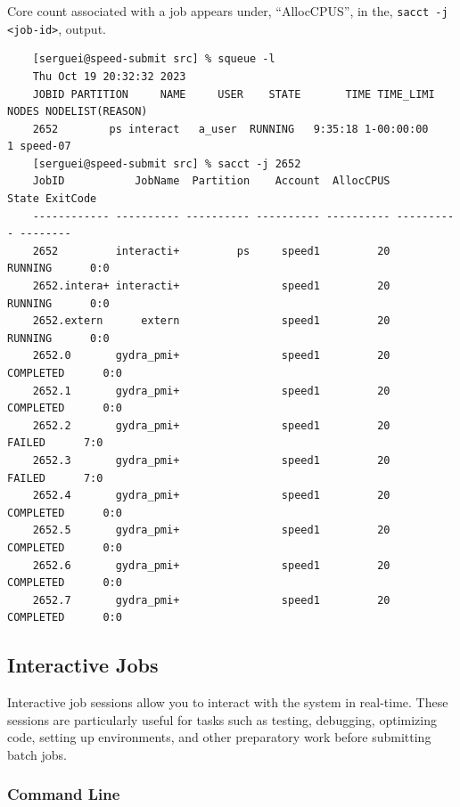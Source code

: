 \noindent Core count associated with a job appears under,
``AllocCPUS'', in the, \texttt{sacct -j <job-id>}, output.

\small
\begin{verbatim}
	[serguei@speed-submit src] % squeue -l
	Thu Oct 19 20:32:32 2023
	JOBID PARTITION     NAME     USER    STATE       TIME TIME_LIMI  NODES NODELIST(REASON)
	2652        ps interact   a_user  RUNNING   9:35:18 1-00:00:00      1 speed-07
	[serguei@speed-submit src] % sacct -j 2652
	JobID           JobName  Partition    Account  AllocCPUS      State ExitCode
	------------ ---------- ---------- ---------- ---------- ---------- --------
	2652         interacti+         ps     speed1         20    RUNNING      0:0
	2652.intera+ interacti+                speed1         20    RUNNING      0:0
	2652.extern      extern                speed1         20    RUNNING      0:0
	2652.0       gydra_pmi+                speed1         20  COMPLETED      0:0
	2652.1       gydra_pmi+                speed1         20  COMPLETED      0:0
	2652.2       gydra_pmi+                speed1         20     FAILED      7:0
	2652.3       gydra_pmi+                speed1         20     FAILED      7:0
	2652.4       gydra_pmi+                speed1         20  COMPLETED      0:0
	2652.5       gydra_pmi+                speed1         20  COMPLETED      0:0
	2652.6       gydra_pmi+                speed1         20  COMPLETED      0:0
	2652.7       gydra_pmi+                speed1         20  COMPLETED      0:0
\end{verbatim}
\normalsize

\subsection{Interactive Jobs}
\label{sect:interactive-jobs}

Interactive job sessions allow you to interact with the system in real-time. 
These sessions are particularly useful for tasks such as testing, debugging, optimizing code, 
setting up environments, and other preparatory work before submitting batch jobs.

\subsubsection{Command Line}
\label{sect:command-line}

